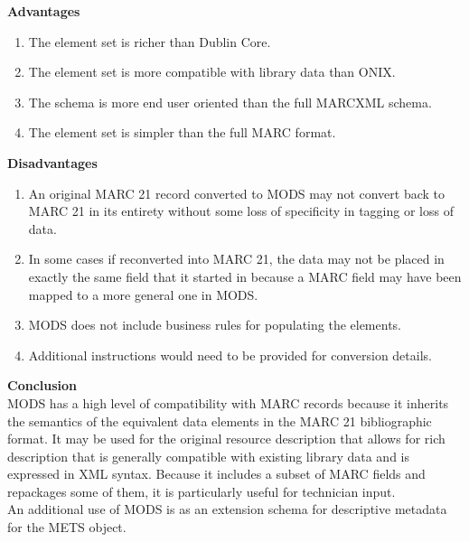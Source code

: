 \begin{enumerate}
	{\bf Advantages}
	\begin{enumerate}
		\item The element set is richer than Dublin Core.
		\item The element set is more compatible with library data than ONIX.
		\item The schema is more end user oriented than the full MARCXML schema.
		\item The element set is simpler than the full MARC format. 
	\end{enumerate}	
	{\bf Disadvantages}
	\begin{enumerate}
		\item An original MARC 21 record converted to MODS may not convert back to MARC 21 in its entirety without some loss of specificity in tagging or loss of data.
		\item In some cases if reconverted into MARC 21, the data may not be placed in exactly the same field that it started in because a MARC field may have been mapped to a more general one in MODS.
		\item MODS does not include business rules for populating the elements.
		\item Additional instructions would need to be provided for conversion details.
	\end{enumerate}
	{\bf Conclusion}\\
	MODS has a high level of compatibility with MARC records because it inherits the semantics of the equivalent data elements in the MARC 21 bibliographic format. It may be used for the original resource description that allows for rich description that is generally compatible with existing library data and is expressed in XML syntax. Because it includes a subset of MARC fields and repackages some of them, it is particularly useful for technician input.\\
	An additional use of MODS is as an extension schema for descriptive metadata for the METS object.
	
	

\end{enumerate}
